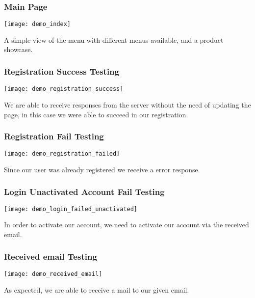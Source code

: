 \subsubsection[Main Page]{Main Page}
\begin{center}
    \texttt{[image: demo\_index]}
\end{center}
\begin{flushleft}
    A simple view of the menu with different menus available, and a product showcase.
\end{flushleft}

\subsubsection[Registration Success Testing]{Registration Success Testing}
\begin{center}
    \texttt{[image: demo\_registration\_success]}
\end{center}
\begin{flushleft}
    We are able to receive responses from the server without the need of updating the page, in this case we were able to succeed in our registration.
\end{flushleft}

\subsubsection[Registration Fail Testing]{Registration Fail Testing}
\begin{center}
    \texttt{[image: demo\_registration\_failed]}
\end{center}
\begin{flushleft}
    Since our user was already registered we receive a error response.
\end{flushleft}

\subsubsection[Login Unactivated Account Fail Testing]{Login Unactivated Account Fail Testing}
\begin{center}
    \texttt{[image: demo\_login\_failed\_unactivated]}
\end{center}
\begin{flushleft}
    In order to activate our account, we need to activate our account via the received email.
\end{flushleft}

\subsubsection[Received email Testing]{Received email Testing}
\begin{center}
    \texttt{[image: demo\_received\_email]}
\end{center}
\begin{flushleft}
    As expected, we are able to receive a mail to our given email.
\end{flushleft}

